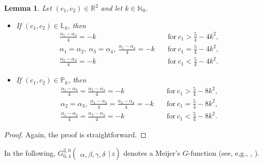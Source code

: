 \documentclass[reqno,11pt,centertags]{amsart}
\newcommand{\bbN}{{\mathbb{N}}}
\newcommand{\bbR}{{\mathbb{R}}}
\newcommand{\<}{\langle}
\renewcommand{\>}{\rangle}
\newcommand{\lb}{\label}
\numberwithin{equation}{section}
\newtheorem{lemma}[theorem]{Lemma}
\theoremstyle{definition}
\begin{document}
\begin{lemma} \lb{lA.2} 
Let $(c_1,c_2)\in \bbR^2$ and let $k\in \bbN_0$. 
\begin{itemize}
\item[(a)] If $(c_1,c_2)\in \mathbb{L}_k$, then 
\begin{align}
\frac{\alpha_1-\alpha_4}{4}=-k &\quad  \mbox{for}\ c_1>\frac{5}{4}- 4k^2,\\[5pt]
\alpha_1=\alpha_2,\ \alpha_3=\alpha_4,\ \frac{\alpha_1-\alpha_4}{4}=-k &\quad   \mbox{for}\ c_1=\frac{5}{4}- 4k^2,\\[5pt]
\frac{\alpha_2-\alpha_3}{4}=-k &\quad \mbox{for}\  c_1<\frac{5}{4}- 4k^2.
\end{align}
\item[(b)]  If $(c_1,c_2)\in \mathbb{P}_k$,   then 
\begin{align}
\frac{\alpha_1-\alpha_3}{4} =\frac{\alpha_2-\alpha_4}{4}=-k &\quad  \mbox{for}\ c_1>\frac{5}{4}- 8k^2,\\[5pt]
\alpha_2=\alpha_3,\ \frac{\alpha_1-\alpha_3}{4}= \frac{\alpha_2-\alpha_4}{4}=-k &\quad   \mbox{for}\ c_1=\frac{5}{4}- 8k^2,\\[5pt]
\frac{\alpha_1-\alpha_2}{4}= \frac{\alpha_3-\alpha_4}{4}=-k &\quad \mbox{for}\  c_1<\frac{5}{4}- 8k^2.
\end{align}
\end{itemize}
\end{lemma}
\begin{proof}
Again, the proof is straightforward.
\end{proof}

In the following, $G_{0,4}^{2,0}\left(\!\begin{array}{c}\\
{\alpha, \beta,\gamma,\delta}\end{array} \bigg\vert\, z \right)$ denotes a Meijer's $G$-function (see, e,g., \cite[Sects.~5.3--5.6]{EMOT53}, \cite[Ch.~16]{OLBC10}). 
 
\end{document}
